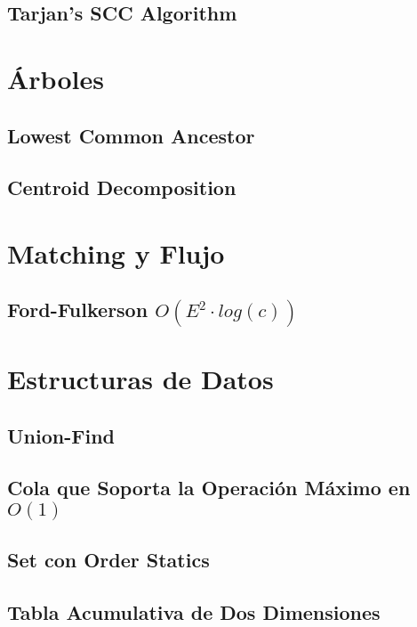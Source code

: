 \subsection{Tarjan's SCC Algorithm}
\raggedbottom
\hrulefill

\section{\'Arboles}
\subsection{Lowest Common Ancestor}
\raggedbottom
\hrulefill
\subsection{Centroid Decomposition}
\raggedbottom
\hrulefill

\section{Matching y Flujo}
\subsection{Ford-Fulkerson $O(E^2 \cdot log(c))$}
\raggedbottom
\hrulefill

\section{Estructuras de Datos}
\subsection{Union-Find}
\raggedbottom
\hrulefill
\subsection{Cola que Soporta la Operaci\'on M\'aximo en $O(1)$}
\raggedbottom
\hrulefill
\subsection{Set con Order Statics}
\raggedbottom
\hrulefill
\subsection{Tabla Acumulativa de Dos Dimensiones}
\raggedbottom
\hrulefill
